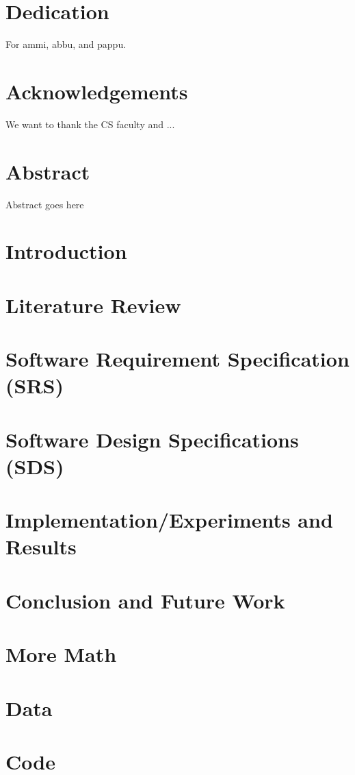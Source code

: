 \documentclass[12pt]{report}
\begin{document}
\chapter*{Dedication}
For ammi, abbu, and pappu.

\chapter*{Acknowledgements}
We want to thank the CS faculty and ...

\chapter*{Abstract}
Abstract goes here

\tableofcontents
\listoffigures
\listoftables


\chapter{Introduction}
\label{chap:intro}


\chapter{Literature Review}
\label{chap:lit}


\chapter{Software Requirement Specification (SRS)}
\label{chap:srs}


\chapter{Software Design Specifications (SDS)}
\label{chap:sds}


\chapter{Implementation/Experiments and Results}
\label{chap:results}


\chapter{Conclusion and Future Work}
\label{chap:outro}



\appendix
\chapter{More Math}


\chapter{Data}


\chapter{Code}



\printbibliography[heading=bibintoc,title={References}]
\end{document}
